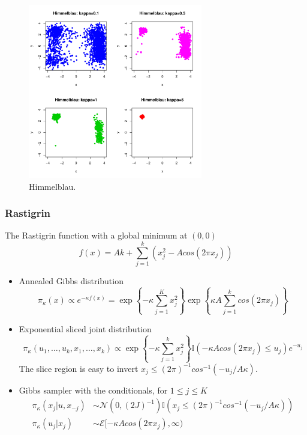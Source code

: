 \documentclass[notes=show,smaller]{beamer}
\begin{document}
\begin{frame}

\begin{figure}[hbp]
\includegraphics[height=3in,width=\textwidth]{john-himmelblau.pdf}
\caption{Himmelblau.}
\end{figure}

\end{frame}
\begin{frame}
\frametitle{Rastigrin}

\footnotesize
The Rastigrin function with a global minimum at $ (0,0)$
$$
f( x ) = A k + \sum_{j=1}^k \left ( x_j^2 - A cos ( 2 \pi x_j ) \right )
$$
\begin{itemize}
\item Annealed Gibbs distribution
$$
\pi_\kappa ( x ) \propto e^{ - \kappa f( x ) } = \exp \left \{ - \kappa \sum_{j=1}^K x_j^2 \right \}
 \exp \left \{ \kappa A \sum_{j=1}^k  cos ( 2 \pi x_j ) \right \}
$$
\item
Exponential sliced joint distribution
$$
 \pi_\kappa ( u_1 , \ldots , u_k , x_1 , \ldots ,x_k  ) \propto \exp \left \{ - \kappa \sum_{j=1}^k x_j^2 \right \}
\mathbb{I} \left ( - \kappa A cos (2 \pi x_j ) \leq u_j  \right ) e^{- u_j}
$$
The slice region is easy to invert
$ x_j \leq (2 \pi)^{-1} cos^{-1} \left ( - u_j /A \kappa \right ) $.
\item
Gibbs sampler with the conditionals, for $ 1 \leq j \leq K $
\begin{align*}
\pi_\kappa ( x_j | u , x_{-j} ) & \sim \mathcal{N} \left ( 0 , (2J)^{-1} \right )
 \mathbb{I} \left ( x_j \leq (2 \pi)^{-1} cos^{-1} \left ( - u_j /A \kappa \right )  \right )\\
\pi_\kappa ( u_j | x_j  ) & \sim \mathcal{E} [ - \kappa A cos (2 \pi x_j ) , \infty )
\end{align*}
\end{itemize}
\normalsize

\end{frame}
\end{document}
